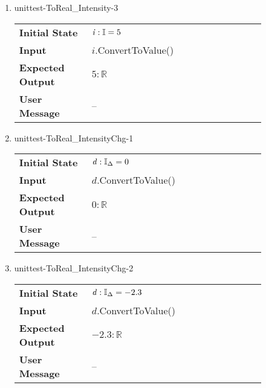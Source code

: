 \begin{enumerate}
    \item{unittest-ToReal\_Intensity-3}
    \begin{table}[H]
        \centering
        \begin{tabular}{P{0.25\linewidth}P{0.6\linewidth}}
            \toprule
            \textbf{Initial State} & $\mathit{i} : \mathbb{I} = 5$ \\
            \textbf{Input} & $\mathit{i}$.ConvertToValue() \\
            \midrule
            \textbf{Expected Output} & $5 : \mathbb{R}$ \\
            \textbf{User Message} & -- \\ \bottomrule
        \end{tabular}
    \end{table}

    \item{unittest-ToReal\_IntensityChg-1}
    \begin{table}[H]
        \centering
        \begin{tabular}{P{0.25\linewidth}P{0.6\linewidth}}
            \toprule
            \textbf{Initial State} & $\mathit{d} : \mathbb{I}_{\Delta} = 0$ \\
            \textbf{Input} & $\mathit{d}$.ConvertToValue() \\
            \midrule
            \textbf{Expected Output} & $0 : \mathbb{R}$ \\
            \textbf{User Message} & -- \\ \bottomrule
        \end{tabular}
    \end{table}

    \item{unittest-ToReal\_IntensityChg-2}
    \begin{table}[H]
        \centering
        \begin{tabular}{P{0.25\linewidth}P{0.6\linewidth}}
            \toprule
            \textbf{Initial State} & $\mathit{d} : \mathbb{I}_{\Delta} = -2.3$ \\
            \textbf{Input} & $\mathit{d}$.ConvertToValue() \\
            \midrule
            \textbf{Expected Output} & $-2.3 : \mathbb{R}$ \\
            \textbf{User Message} & -- \\ \bottomrule
        \end{tabular}
    \end{table}


\end{enumerate}
